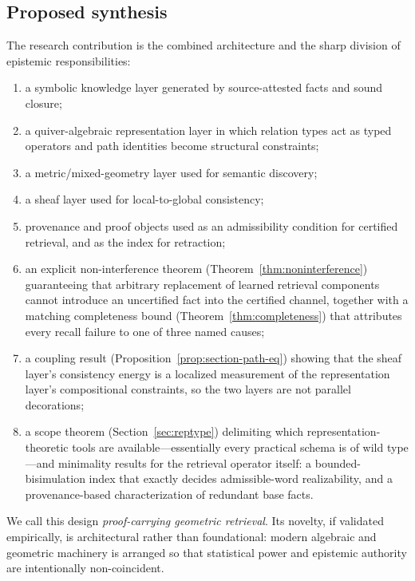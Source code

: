 \documentclass[11pt]{article}
\begin{document}
\subsection{Proposed synthesis}
The research contribution is the combined architecture and the sharp division of epistemic responsibilities:
\begin{enumerate}[leftmargin=*]
    \item a symbolic knowledge layer generated by source-attested facts and sound closure;
    \item a quiver-algebraic representation layer in which relation types act as typed operators and path identities become structural constraints;
    \item a metric/mixed-geometry layer used for semantic discovery;
    \item a sheaf layer used for local-to-global consistency;
    \item provenance and proof objects used as an admissibility condition for certified retrieval, and as the index for retraction;
    \item an explicit non-interference theorem (Theorem~\ref{thm:noninterference}) guaranteeing that arbitrary replacement of learned retrieval components cannot introduce an uncertified fact into the certified channel, together with a matching completeness bound (Theorem~\ref{thm:completeness}) that attributes every recall failure to one of three named causes;
    \item a coupling result (Proposition~\ref{prop:section-path-eq}) showing that the sheaf layer's consistency energy is a localized measurement of the representation layer's compositional constraints, so the two layers are not parallel decorations;
    \item a scope theorem (Section~\ref{sec:reptype}) delimiting which representation-theoretic tools are available---essentially every practical schema is of wild type---and minimality results for the retrieval operator itself: a bounded-bisimulation index that exactly decides admissible-word realizability, and a provenance-based characterization of redundant base facts.
\end{enumerate}

We call this design \emph{proof-carrying geometric retrieval}. Its novelty, if validated empirically, is architectural rather than foundational: modern algebraic and geometric machinery is arranged so that statistical power and epistemic authority are intentionally non-coincident.
\end{document}
